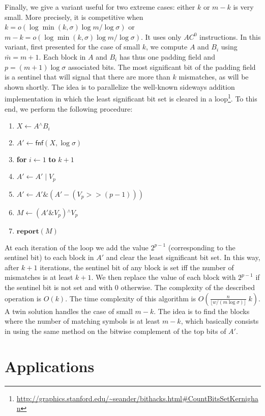 \documentclass{llncs}
\newcommand{\floor}[1]{\lfloor #1 \rfloor}
\newcommand{\uxor}{\mathrel{^\wedge}}
\newcommand{\uand}{\mathrel{\&}}
\newcommand{\uor}{\mathrel{|}}
\newcommand{\word}[1]{#1}
\begin{document}
Finally, we give a variant useful for two extreme cases:
either $k$ or $m-k$ is very small.
More precisely, it is competitive when $k =
o(\log \min(k,\sigma) \log m / \log\sigma)$ or $m - k = o(\log \min(k,\sigma) \log m / \log\sigma)$.
It uses only $AC^0$ instructions.
In this variant, first presented for the case of small $k$, we compute $A$ and $B_i$ using $\bar{m} = m + 1$.
Each block in $A$ and $B_i$ has
thus one padding field and $p = (m+1)\log\sigma$ associated bits. The most significant bit
of the padding field is a sentinel that will signal that there
are more than $k$ mismatches, as
will be shown shortly.
The idea is to parallelize the well-known
sideways addition implementation in which the least significant bit
set is cleared in a
loop\footnote{\url{http://graphics.stanford.edu/~seander/bithacks.html#CountBitsSetKernighan}}.
To this end, we perform the following procedure:
\begin{enumerate}
\item $\word{X}\leftarrow \word{A} \uxor \word{B}_i$
\item $\word{A'}\leftarrow \textsf{fnf}(\word{X}, \log\sigma)$
\item \textbf{for} $i\leftarrow 1$ \textbf{to} $k+1$
\item \qquad $\word{A'} \leftarrow \word{A'} \uor \word{V_p}$
\item \qquad $\word{A'} \leftarrow \word{A'} \uand (\word{A'} - (\word{V_p} >> (p - 1)))$
\item $\word{M} \leftarrow (\word{A'}\uand \word{V_p}) \uxor \word{V_p}$
\item $\textbf{report}(M)$
\end{enumerate}
At each iteration of the loop we add the value $2^{p-1}$
(corresponding to the sentinel bit) to each block in $A'$ and clear
the least significant bit set. In this way, after $k+1$ iterations,
the sentinel bit of any block is set iff the number of mismatches
is at least $k+1$. We then replace the value of each block with $2^{p-1}$
if the sentinel bit is not set and with $0$ otherwise.
The complexity of the described operation is $O(k)$. The time complexity
of this algorithm is $O(\frac{n}{\floor{w/(m\log\sigma)}}\;k)$.
A twin solution handles the case of small $m - k$. The idea is to
find the blocks where the number of matching symbols is at least $m - k$,
which basically consists in using the same method on the bitwise complement of the top bits of
$\word{A'}$.

\section{Applications}
\end{document}
